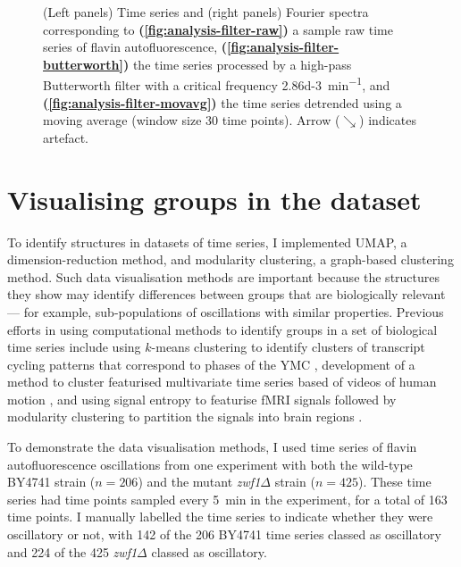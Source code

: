 \begin{figure}
  \caption[
    Time series and Fourier spectra corresponding to
    a sample raw time series of flavin autofluorescence,
    the time series processed by a high-pass Butterworth filter, and
    the time series detrended using a moving average.
  ]{
    (Left panels) Time series and (right panels) Fourier spectra corresponding to
    \textbf{(\ref{fig:analysis-filter-raw})}
    a sample raw time series of flavin autofluorescence,
    \textbf{(\ref{fig:analysis-filter-butterworth})}
    the time series processed by a high-pass Butterworth filter with a critical frequency \SI{2.86d-3}{\minute^{-1}}, and
    \textbf{(\ref{fig:analysis-filter-movavg})}
    the time series detrended using a moving average (window size 30 time points).
    Arrow ($\searrow$) indicates artefact.
  }
  \label{fig:analysis-filter}
\end{figure}

\section{Visualising groups in the dataset}
\label{sec:analysis-clustering}

To identify structures in datasets of time series, I implemented UMAP, a dimension-reduction method, and modularity clustering, a graph-based clustering method.
Such data visualisation methods are important because the structures they show may identify differences between groups that are biologically relevant --- for example, sub-populations of oscillations with similar properties.
Previous efforts in using computational methods to identify groups in a set of biological time series include using $k$-means clustering to identify clusters of transcript cycling patterns that correspond to phases of the YMC \parencite{tuLogicYeastMetabolic2005}, development of a method to cluster featurised multivariate time series based of videos of human motion \parencite{wangStructureBasedStatisticalFeatures2007}, and using signal entropy to featurise fMRI signals followed by modularity clustering to partition the signals into brain regions \parencite{shafieiDopamineSignalingModulates2019}.

To demonstrate the data visualisation methods, I used time series of flavin autofluorescence oscillations from one experiment with both the wild-type BY4741 strain ($n=206$) and the mutant \textit{zwf1$\Delta$} strain ($n=425$).
These time series had time points sampled every \SI{5}{\minute} in the experiment, for a total of 163 time points.
I manually labelled the time series to indicate whether they were oscillatory or not, with 142 of the 206 BY4741 time series classed as oscillatory and 224 of the 425 \textit{zwf1$\Delta$} classed as oscillatory.


